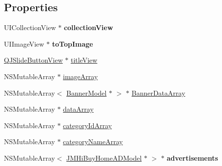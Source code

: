 \subsection*{Properties}
\begin{DoxyCompactItemize}
\item 
\mbox{\label{category_j_m_hi_buy_home_controller_07_08_a3ab5da22641c5849da997280676bc354}} 
U\+I\+Collection\+View $\ast$ {\bfseries collection\+View}
\item 
\mbox{\label{category_j_m_hi_buy_home_controller_07_08_a47fa5dcb4d510a02671f2a69d975249e}} 
U\+I\+Image\+View $\ast$ {\bfseries to\+Top\+Image}
\item 
\mbox{\hyperlink{interface_q_j_slide_button_view}{Q\+J\+Slide\+Button\+View}} $\ast$ \mbox{\hyperlink{category_j_m_hi_buy_home_controller_07_08_a28ac2762f7171831b4ef30e9e15c4455}{title\+View}}
\item 
N\+S\+Mutable\+Array $\ast$ \mbox{\hyperlink{category_j_m_hi_buy_home_controller_07_08_ae4f64f907780058437c59a13d1ff8fc8}{image\+Array}}
\item 
N\+S\+Mutable\+Array$<$ \mbox{\hyperlink{interface_banner_model}{Banner\+Model}} $\ast$ $>$ $\ast$ \mbox{\hyperlink{category_j_m_hi_buy_home_controller_07_08_a7d8ccc1e670d3bc865537a8044998703}{Banner\+Data\+Array}}
\item 
N\+S\+Mutable\+Array $\ast$ \mbox{\hyperlink{category_j_m_hi_buy_home_controller_07_08_a3a39d8f83266b056d2b02d8f29256125}{data\+Array}}
\item 
N\+S\+Mutable\+Array $\ast$ \mbox{\hyperlink{category_j_m_hi_buy_home_controller_07_08_a4b3ad0e2ad71e1e7f9057c4aec509640}{category\+Id\+Array}}
\item 
N\+S\+Mutable\+Array $\ast$ \mbox{\hyperlink{category_j_m_hi_buy_home_controller_07_08_afa811017b2e37d83decb24f9b8045c1f}{category\+Name\+Array}}
\item 
\mbox{\label{category_j_m_hi_buy_home_controller_07_08_a7d3b645aadc670fee6e71fbbe65df8d5}} 
N\+S\+Mutable\+Array$<$ \mbox{\hyperlink{interface_j_m_hi_buy_home_a_d_model}{J\+M\+Hi\+Buy\+Home\+A\+D\+Model}} $\ast$ $>$ $\ast$ {\bfseries advertisements}
\item 
\mbox{\label{category_j_m_hi_buy_home_controller_07_08_a47f192f249ad17df9262eacaaac41808}} 

\end{DoxyCompactItemize}
